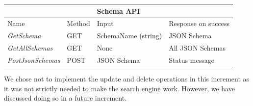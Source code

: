 \begin{table}[]
\begin{tabular}{|llll|}
\hline
\multicolumn{4}{|c|}{\textbf{Schema API}}                                                                                                     \\ \hline
\multicolumn{1}{|l|}{Name}                     & \multicolumn{1}{l|}{Method} & \multicolumn{1}{l|}{Input}               & Response on success \\ \hline
\multicolumn{1}{|l|}{\textit{GetSchema}}       & \multicolumn{1}{l|}{GET}    & \multicolumn{1}{l|}{SchemaName (string)} & JSON Schema         \\ \hline
\multicolumn{1}{|l|}{\textit{GetAllSchemas}}   & \multicolumn{1}{l|}{GET}    & \multicolumn{1}{l|}{None}                & All JSON Schemas    \\ \hline
\multicolumn{1}{|l|}{\textit{PostJsonSchemas}} & \multicolumn{1}{l|}{POST}   & \multicolumn{1}{l|}{JSON Schema}         & Status message      \\ \hline
\end{tabular}
\end{table}


We chose not to implement the update and delete operations in this increment as it was not strictly needed to make the search engine work.
However, we have discussed doing so in a future increment.
